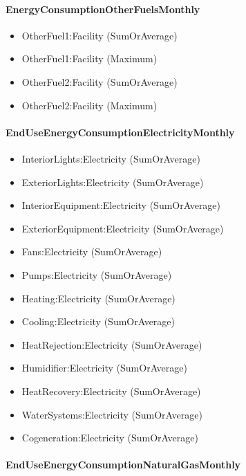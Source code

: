 \paragraph{EnergyConsumptionOtherFuelsMonthly}\label{energyconsumptionotherfuelsmonthly}

\begin{itemize}
\item
  OtherFuel1:Facility (SumOrAverage)
\item
  OtherFuel1:Facility (Maximum)
\item
  OtherFuel2:Facility (SumOrAverage)
\item
  OtherFuel2:Facility (Maximum)
\end{itemize}

\paragraph{EndUseEnergyConsumptionElectricityMonthly}\label{enduseenergyconsumptionelectricitymonthly}

\begin{itemize}
\item
  InteriorLights:Electricity (SumOrAverage)
\item
  ExteriorLights:Electricity (SumOrAverage)
\item
  InteriorEquipment:Electricity (SumOrAverage)
\item
  ExteriorEquipment:Electricity (SumOrAverage)
\item
  Fans:Electricity (SumOrAverage)
\item
  Pumps:Electricity (SumOrAverage)
\item
  Heating:Electricity (SumOrAverage)
\item
  Cooling:Electricity (SumOrAverage)
\item
  HeatRejection:Electricity (SumOrAverage)
\item
  Humidifier:Electricity (SumOrAverage)
\item
  HeatRecovery:Electricity (SumOrAverage)
\item
  WaterSystems:Electricity (SumOrAverage)
\item
  Cogeneration:Electricity (SumOrAverage)
\end{itemize}

\paragraph{EndUseEnergyConsumptionNaturalGasMonthly}\label{enduseenergyconsumptionnaturalgasmonthly}

